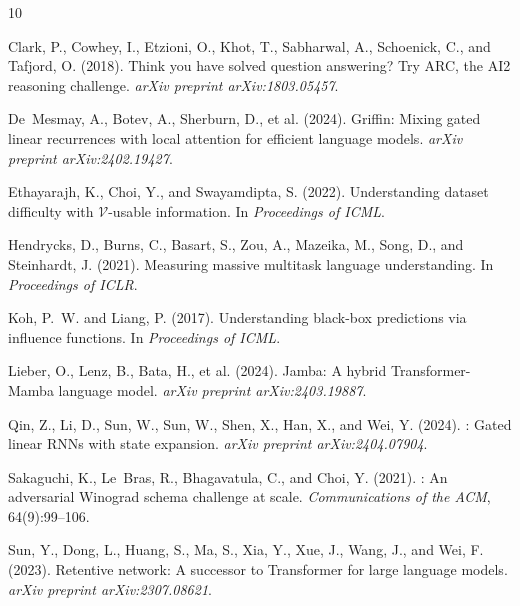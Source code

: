 \documentclass[11pt,a4paper]{article}
\begin{document}
\begin{thebibliography}{10}

Clark, P., Cowhey, I., Etzioni, O., Khot, T., Sabharwal, A., Schoenick, C., and Tafjord, O. (2018).
\newblock Think you have solved question answering? {T}ry {ARC}, the {AI2} reasoning challenge.
\newblock \emph{arXiv preprint arXiv:1803.05457}.

De~Mesmay, A., Botev, A., Sherburn, D., et al. (2024).
\newblock Griffin: Mixing gated linear recurrences with local attention for efficient language models.
\newblock \emph{arXiv preprint arXiv:2402.19427}.

Ethayarajh, K., Choi, Y., and Swayamdipta, S. (2022).
\newblock Understanding dataset difficulty with $\mathcal{V}$-usable information.
\newblock In \emph{Proceedings of ICML}.

Hendrycks, D., Burns, C., Basart, S., Zou, A., Mazeika, M., Song, D., and Steinhardt, J. (2021).
\newblock Measuring massive multitask language understanding.
\newblock In \emph{Proceedings of ICLR}.

Koh, P.~W. and Liang, P. (2017).
\newblock Understanding black-box predictions via influence functions.
\newblock In \emph{Proceedings of ICML}.

Lieber, O., Lenz, B., Bata, H., et al. (2024).
\newblock Jamba: A hybrid {T}ransformer-{M}amba language model.
\newblock \emph{arXiv preprint arXiv:2403.19887}.

Qin, Z., Li, D., Sun, W., Sun, W., Shen, X., Han, X., and Wei, Y. (2024).
: Gated linear {RNN}s with state expansion.
\newblock \emph{arXiv preprint arXiv:2404.07904}.

Sakaguchi, K., Le~Bras, R., Bhagavatula, C., and Choi, Y. (2021).
: An adversarial {W}inograd schema challenge at scale.
\newblock \emph{Communications of the ACM}, 64(9):99--106.

Sun, Y., Dong, L., Huang, S., Ma, S., Xia, Y., Xue, J., Wang, J., and Wei, F. (2023).
\newblock Retentive network: A successor to {T}ransformer for large language models.
\newblock \emph{arXiv preprint arXiv:2307.08621}.


\end{thebibliography}
\end{document}

